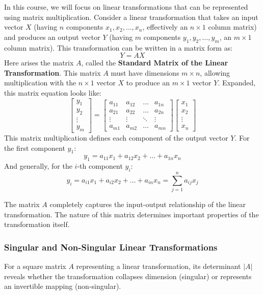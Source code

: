 \documentclass{article}
\begin{document}
In this course, we will focus on linear transformations that can be represented using matrix multiplication. Consider a linear transformation that takes an input vector $X$ (having $n$ components $x_1, x_2, \dots, x_n$, effectively an $n \times 1$ column matrix) and produces an output vector $Y$ (having $m$ components $y_1, y_2, \dots, y_m$, an $m \times 1$ column matrix). This transformation can be written in a matrix form as:
\[ Y = A X \]
Here arises the matrix $A$, called the \textbf{Standard Matrix of the Linear Transformation}. This matrix $A$ must have dimensions $m \times n$, allowing multiplication with the $n \times 1$ vector $X$ to produce an $m \times 1$ vector $Y$.
Expanded, this matrix equation looks like:
\[ \begin{bmatrix} y_1 \\ y_2 \\ \vdots \\ y_m \end{bmatrix} = \begin{bmatrix} a_{11} & a_{12} & \dots & a_{1n} \\ a_{21} & a_{22} & \dots & a_{2n} \\ \vdots & \vdots & \ddots & \vdots \\ a_{m1} & a_{m2} & \dots & a_{mn} \end{bmatrix} \begin{bmatrix} x_1 \\ x_2 \\ \vdots \\ x_n \end{bmatrix} \]
This matrix multiplication defines each component of the output vector $Y$. For the first component $y_1$:
\[ y_1 = a_{11}x_1 + a_{12}x_2 + \dots + a_{1n}x_n \]
And generally, for the $i$-th component $y_i$:
\[ y_i = a_{i1}x_1 + a_{i2}x_2 + \dots + a_{in}x_n = \sum_{j=1}^n a_{ij} x_j \]

The matrix $A$ completely captures the input-output relationship of the linear transformation. The nature of this matrix determines important properties of the transformation itself.

\subsubsection*{Singular and Non-Singular Linear Transformations}

For a square matrix $A$ representing a linear transformation, its determinant $|A|$ reveals whether the transformation collapses dimension (singular) or represents an invertible mapping (non-singular).
\end{document}
